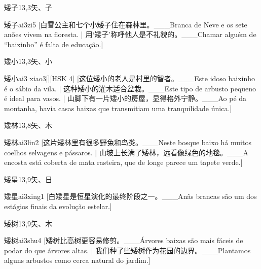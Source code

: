 \begin{entry}{矮子}{13,3}{⽮、⼦}
  \begin{phonetics}{矮子}{ai3zi5}
    [白雪公主和七个小矮子住在森林里。___Branca de Neve e os sete anões vivem na floresta. | 用`矮子'称呼他人是不礼貌的。___Chamar alguém de ``baixinho'' é falta de educação.]
  \end{phonetics}
\end{entry}

\begin{entry}{矮小}{13,3}{⽮、⼩}
  \begin{phonetics}{矮小}{ai3 xiao3}[][HSK 4]
    [这位矮小的老人是村里的智者。___Este idoso baixinho é o sábio da vila. | 这种矮小的灌木适合盆栽。___Este tipo de arbusto pequeno é ideal para vasos. | 山脚下有一片矮小的房屋，显得格外宁静。___Ao pé da montanha, havia casas baixas que transmitiam uma tranquilidade única.]
  \end{phonetics}
\end{entry}

\begin{entry}{矮林}{13,8}{⽮、⽊}
  \begin{phonetics}{矮林}{ai3lin2}
    [这片矮林里有很多野兔和鸟类。___Neste bosque baixo há muitos coelhos selvagens e pássaros. | 山坡上长满了矮林，远看像绿色的地毯。___A encosta está coberta de mata rasteira, que de longe parece um tapete verde.]
  \end{phonetics}
\end{entry}

\begin{entry}{矮星}{13,9}{⽮、⽇}
  \begin{phonetics}{矮星}{ai3xing1}
    [白矮星是恒星演化的最终阶段之一。___Anãs brancas são um dos estágios finais da evolução estelar.]
  \end{phonetics}
\end{entry}

\begin{entry}{矮树}{13,9}{⽮、⽊}
  \begin{phonetics}{矮树}{ai3shu4}
    [矮树比高树更容易修剪。___Árvores baixas são mais fáceis de podar do que árvores altas. | 我们种了些矮树作为花园的边界。___Plantamos alguns arbustos como cerca natural do jardim.]
  \end{phonetics}
\end{entry}

